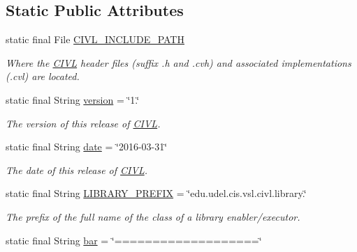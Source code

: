 \subsection*{Static Public Attributes}
\begin{DoxyCompactItemize}
\item 
static final File \hyperlink{classedu_1_1udel_1_1cis_1_1vsl_1_1civl_1_1config_1_1IF_1_1CIVLConstants_a258b69dc6d73c0d5c9f7f36542d11917}{C\+I\+V\+L\+\_\+\+I\+N\+C\+L\+U\+D\+E\+\_\+\+P\+A\+T\+H}
\begin{DoxyCompactList}\small\item\em Where the \hyperlink{classedu_1_1udel_1_1cis_1_1vsl_1_1civl_1_1CIVL}{C\+I\+V\+L} header files (suffix .h and .cvh) and associated implementations (.cvl) are located. \end{DoxyCompactList}\item 
static final String \hyperlink{classedu_1_1udel_1_1cis_1_1vsl_1_1civl_1_1config_1_1IF_1_1CIVLConstants_ac0c7fff17695b5ca83703765a4fa2f53}{version} = \char`\"{}1.\char`\"{}
\begin{DoxyCompactList}\small\item\em The version of this release of \hyperlink{classedu_1_1udel_1_1cis_1_1vsl_1_1civl_1_1CIVL}{C\+I\+V\+L}. \end{DoxyCompactList}\item 
static final String \hyperlink{classedu_1_1udel_1_1cis_1_1vsl_1_1civl_1_1config_1_1IF_1_1CIVLConstants_a8a39e679b5e676271b7dc2f1d2efc2d5}{date} = \char`\"{}2016-\/03-\/31\char`\"{}
\begin{DoxyCompactList}\small\item\em The date of this release of \hyperlink{classedu_1_1udel_1_1cis_1_1vsl_1_1civl_1_1CIVL}{C\+I\+V\+L}. \end{DoxyCompactList}\item 
\hypertarget{classedu_1_1udel_1_1cis_1_1vsl_1_1civl_1_1config_1_1IF_1_1CIVLConstants_a85ce02e0194ff8635c13d3ebf41c63a6}{}static final String \hyperlink{classedu_1_1udel_1_1cis_1_1vsl_1_1civl_1_1config_1_1IF_1_1CIVLConstants_a85ce02e0194ff8635c13d3ebf41c63a6}{L\+I\+B\+R\+A\+R\+Y\+\_\+\+P\+R\+E\+F\+I\+X} = \char`\"{}edu.\+udel.\+cis.\+vsl.\+civl.\+library.\char`\"{}\label{classedu_1_1udel_1_1cis_1_1vsl_1_1civl_1_1config_1_1IF_1_1CIVLConstants_a85ce02e0194ff8635c13d3ebf41c63a6}

\begin{DoxyCompactList}\small\item\em The prefix of the full name of the class of a library enabler/executor. \end{DoxyCompactList}\item 
\hypertarget{classedu_1_1udel_1_1cis_1_1vsl_1_1civl_1_1config_1_1IF_1_1CIVLConstants_ad075f898f1753398a87c073c4e3d5fe8}{}static final String \hyperlink{classedu_1_1udel_1_1cis_1_1vsl_1_1civl_1_1config_1_1IF_1_1CIVLConstants_ad075f898f1753398a87c073c4e3d5fe8}{bar} = \char`\"{}===================\char`\"{}\label{classedu_1_1udel_1_1cis_1_1vsl_1_1civl_1_1config_1_1IF_1_1CIVLConstants_ad075f898f1753398a87c073c4e3d5fe8}


\end{DoxyCompactItemize}
